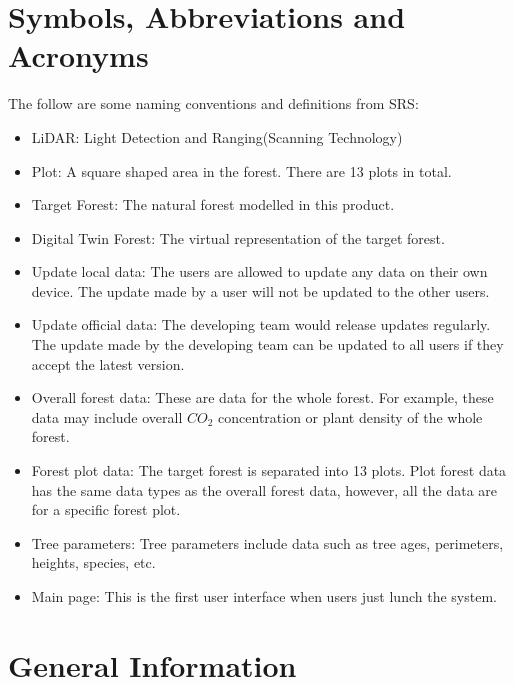\documentclass[12pt, titlepage]{article}
\begin{document}
\section{Symbols, Abbreviations and Acronyms}
The follow are some naming conventions and definitions from SRS:
\begin{itemize}
    \item LiDAR: Light Detection and Ranging(Scanning Technology)
    \item Plot: A square shaped area in the forest. There are 13 plots in
    total. 
    \item Target Forest: The natural forest modelled in this product.
    \item Digital Twin Forest: The virtual representation of the target
    forest.
    \item Update local data: The users are allowed to update any data on their
    own device. The update made by a user will not be updated to the other
    users.
    \item Update official data: The developing team would release updates
    regularly. The update made by the developing team can be updated to all
    users if they accept the latest version.
    \item Overall forest data: These are data for the whole forest. For
    example, these data may include overall $CO_2$ concentration or plant
    density of the whole forest.
    \item Forest plot data: The target forest is separated into 13 plots. Plot
    forest data has the same data types as the overall forest data, however,
    all the data are for a specific forest plot.
    \item Tree parameters: Tree parameters include data such as tree ages,
    perimeters, heights, species, etc.
    \item Main page: This is the first user interface when users just lunch the 
    system.
\end{itemize}
\newpage

\section{General Information}
\end{document}
